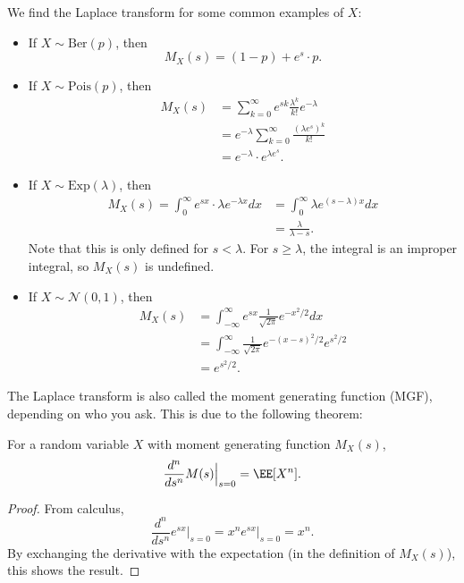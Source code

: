 \documentclass{ximera}
\begin{document}
\begin{example}
We find the Laplace transform for some common examples of $X$:
\begin{itemize}
\item
If $X \sim \mathrm{Ber}(p)$, then 
$$
M_X(s) = (1-p) +e^s \cdot p.
$$

\item
If $X\sim \mathrm{Pois}(p)$, then
\begin{align*}
M_X(s) &= \sum_{k=0}^{\infty} e^{sk} \frac{\lambda^k}{k!} e^{-\lambda}\\
&= e^{-\lambda} \sum_{k=0}^{\infty} \frac{(\lambda e^s)^k}{k!} \\
&= e^{-\lambda} \cdot e^{\lambda e^s}.
\end{align*}

\item
If $X \sim \mathrm{Exp}(\lambda)$, then
\begin{align*}
M_X(s) = \int_0^{\infty} e^{sx} \cdot \lambda e^{-\lambda x} dx &= \int_0^{\infty} \lambda e^{(s-\lambda)x}dx \\
&= \frac{\lambda}{\lambda-s}.
\end{align*}
Note that this is only defined for $s<\lambda$. For $s \geq \lambda$, the integral is an improper integral, so $M_X(s)$ is undefined.

\item
If $X \sim \mathcal{N}(0,1)$, then
\begin{align*}
M_X(s) &= \int_{-\infty}^{\infty} e^{sx} \frac{1}{\sqrt{2\pi}} e^{-x^2/2}dx \\
&= \int_{-\infty}^{\infty} \frac{1}{\sqrt{2\pi}} e^{-(x-s)^2/2} e^{s^2/2} \\
&= e^{s^2/2}.
\end{align*}
\end{itemize}
\end{example}

The Laplace transform is also called the moment generating function (MGF), depending on who you ask. This is due to the following theorem:
\begin{theorem}
For a random variable $X$ with moment generating function $M_X(s)$,
$$
\frac{d^n}{ds^n} M(s) \Big|_{s=0} = \EE[X^n].
$$
\end{theorem}
\begin{proof}
From calculus,
$$
\frac{d^n}{ds^n} e^{sx} \Big|_{s=0} = x^n e^{sx} \Big|_{s=0} = x^n.
$$
By exchanging the derivative with the expectation (in the definition of $M_X(s)$), this shows the result.
\end{proof}
\end{document}
